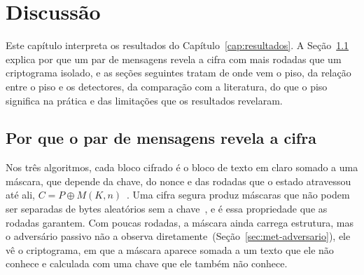 
\chapter{Discussão}
\label{cap:discussao}

Este capítulo interpreta os resultados do Capítulo~\ref{cap:resultados}. A Seção~\ref{sec:disc-par} explica por que um par de mensagens revela a cifra com mais rodadas que um criptograma isolado, e as seções seguintes tratam de onde vem o piso, da relação entre o piso e os detectores, da comparação com a literatura, do que o piso significa na prática e das limitações que os resultados revelaram.

\section{Por que o par de mensagens revela a cifra}
\label{sec:disc-par}

Nos três algoritmos, cada bloco cifrado é o bloco de texto em claro somado a uma máscara, que depende da chave, do nonce e das rodadas que o estado atravessou até ali, $C = P \oplus M(K, n)$~\cite{nist_sp800232_2025,Banik2021,Beierle2021SparkleSub}. Uma cifra segura produz máscaras que não podem ser separadas de bytes aleatórios sem a chave~\cite{Rogaway2004Nonce,KatzLindell2014IMC}, e é essa propriedade que as rodadas garantem. Com poucas rodadas, a máscara ainda carrega estrutura, mas o adversário passivo não a observa diretamente~(Seção~\ref{sec:met-adversario}), ele vê o criptograma, em que a máscara aparece somada a um texto que ele não conhece e calculada com uma chave que ele também não conhece.

